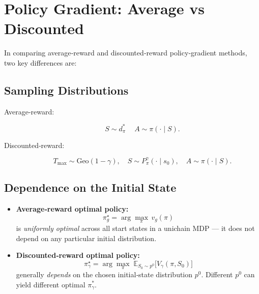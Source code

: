 \section{Policy Gradient: Average vs Discounted}
\label{sec:policy_gradient_average_vs_discounted}

In comparing average‐reward and discounted‐reward policy‐gradient methods, two key differences are:

\subsection{Sampling Distributions}

\begin{description}
  \item[Average‐reward:]  
    \[
      S\sim d^{\ast}_{\pi}\
      \quad
      A\sim\pi(\cdot\mid S).
    \]

  \item[Discounted‐reward:]  
    \[
      T_{\max}\sim\mathrm{Geo}(1-\gamma),
      \quad
      S\sim P_{\pi}^{\gamma}(\cdot\mid s_{0}),
      \quad
      A\sim\pi(\cdot\mid S).
    \]
\end{description}

\subsection{Dependence on the Initial State}

\begin{itemize}
  \item \textbf{Average‐reward optimal policy:}
    \[
      \pi^{\star}_{g}
      = \arg\max_{\pi}\,v_g(\pi)
    \]
    is \emph{uniformly optimal} across all start states in a unichain MDP — it does not depend on any particular initial distribution.

  \item \textbf{Discounted‐reward optimal policy:}
    \[
      \pi^{\star}_{\gamma}
      = \arg\max_{\pi}\;\mathbb{E}_{S_{0}\sim p^{0}}\bigl[V_{\gamma}(\pi,S_{0})\bigr]
    \]
    generally \emph{depends} on the chosen initial‐state distribution \(p^{0}\).  Different \(p^0\) can yield different optimal \(\pi^{\ast}_\gamma\).
\end{itemize}
